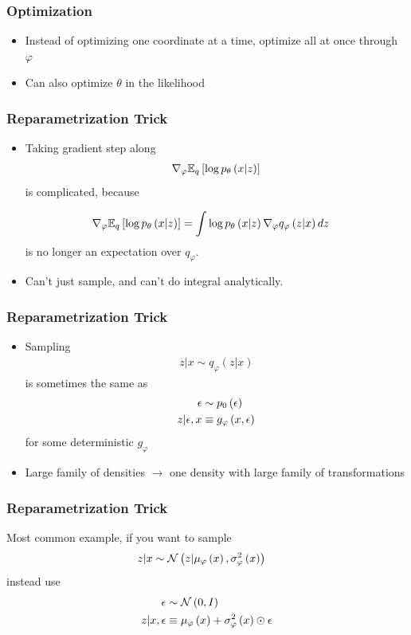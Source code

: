 \documentclass[10pt,mathserif]{beamer}
\begin{document}
\begin{frame}
  \frametitle{Optimization}
\begin{itemize}
\item Instead of optimizing one coordinate at a time, optimize all at once
  through $\varphi$
\item Can also optimize $\theta$ in the likelihood
\end{itemize}
\end{frame}

\begin{frame}
  \frametitle{Reparametrization Trick}
  \begin{itemize}
  \item Taking gradient step along
  \begin{align*}
    \nabla_{\varphi} \mathbb{E}_{q}\left[{\log p_{\theta}\left(x \vert z\right)}\right]
  \end{align*}
  is complicated, because

  \begin{align*}
    \nabla_{\varphi} \mathbb{E}_{q}\left[{\log p_{\theta}\left(x \vert z\right)}\right] &= \int \log p_{\theta}\left(x \vert z\right)
    \nabla_{\varphi}q_{\varphi}\left(z \vert x\right)dz
  \end{align*}
  is no longer an expectation over $q_{\varphi}$.
  \item Can't just sample, and can't do integral analytically.
  \end{itemize}
\end{frame}

\begin{frame}
  \frametitle{Reparametrization Trick}
  \begin{itemize}
  \item Sampling
  \begin{align*}
    z \vert x \sim q_{\varphi}\left(z \vert x\right)
  \end{align*}
  is sometimes the same as
  \begin{align*}
    \epsilon &\sim p_{0}\left(\epsilon\right) \\
    z \vert \epsilon, x &\equiv g_{\varphi}\left(x, \epsilon\right)
  \end{align*}
  for some deterministic $g_{\varphi}$
  \item Large family of densities $\rightarrow$ one density with large family of
    transformations
  \end{itemize}
\end{frame}

\begin{frame}
  \frametitle{Reparametrization Trick}
  Most common example, if you want to sample
  \begin{align*}
    z \vert x &\sim \mathcal{N}\left(z \vert \mu_{\varphi}\left(x\right), \sigma_{\varphi}^{2}\left(x\right)\right)
  \end{align*}
  instead use
  \begin{align*}
    \epsilon &\sim \mathcal{N}\left(0, I\right) \\
    z \vert x, \epsilon &\equiv \mu_{\varphi}\left(x\right) + \sigma_{\varphi}^{2}\left(x\right) \odot \epsilon
  \end{align*}
\end{frame}
\end{document}
